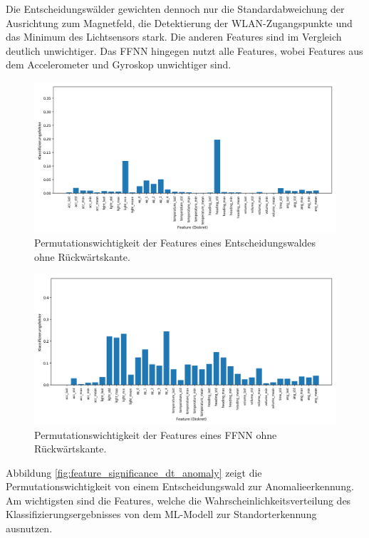 Die Entscheidungswälder gewichten dennoch nur die Standardabweichung der Ausrichtung zum Magnetfeld, die Detektierung der WLAN-Zugangspunkte und das Minimum des Lichtsensors stark.
Die anderen Features sind im Vergleich deutlich unwichtiger.
Das FFNN hingegen nutzt alle Features, wobei Features aus dem Accelerometer und Gyroskop unwichtiger sind.
\begin{figure}[h!]
    \centering
    \includegraphics[width=\linewidth]{images/fi_wo_fe_dt.png}
    \caption{Permutationswichtigkeit der Features eines Entscheidungswaldes ohne Rückwärtskante.}
    \label{fig:feature_significance_dt_wo_fe}
\end{figure}
\begin{figure}[h!]
    \centering
    \includegraphics[width=\linewidth]{images/fi_wo_fe_knn.png}
    \caption{Permutationswichtigkeit der Features eines FFNN ohne Rückwärtskante.}
    \label{fig:feature_significance_knn_wo_fe}
\end{figure}
\newpage
Abbildung \ref{fig:feature_significance_dt_anomaly} zeigt die Permutationswichtigkeit von einem Entscheidungswald zur Anomalieerkennung.
Am wichtigsten sind die Features, welche die Wahrscheinlichkeitsverteilung des Klassifizierungsergebnisses von dem ML-Modell zur Standorterkennung ausnutzen.
